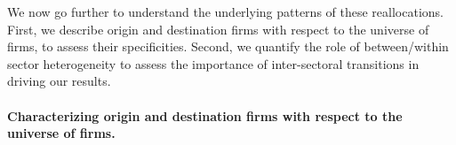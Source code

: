 

We now go further to understand the underlying patterns of these reallocations. First, we describe origin and destination firms with respect to the universe of firms, to assess their specificities. Second, we quantify the role of between/within sector heterogeneity to assess the importance of inter-sectoral transitions in driving our results.

\paragraph{Characterizing origin and destination firms with respect to the universe of firms.}
\label{sec:rolefirm:hiring_firing}



